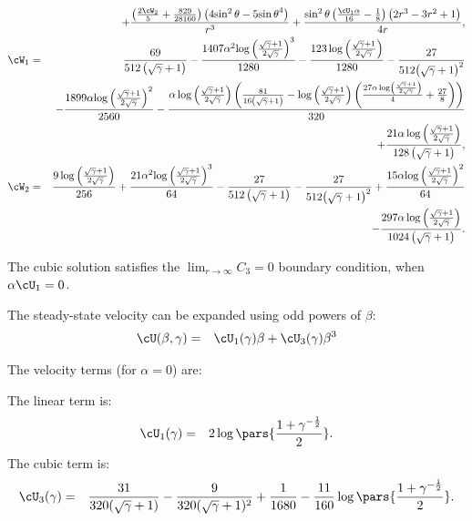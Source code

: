\begin{eqnarray*}
\\ && + \frac{\left(\frac{2 {\cW_2}}{5} + \frac{829}{28160}\right) \left(4 {\sin^2\theta} - 5 {\sin\theta}^4\right)}{r^3} + \frac{{\sin^2\theta} \left(\frac{{\cU_1}\alpha}{16} - \frac{1}{8}\right) \left(2 r^3 - 3 r^2 + 1\right)}{4 r},
\\
\cW_1 &=& \frac{69}{512 \left(\sqrt{\gamma} + 1\right)} - \frac{1407\alpha^2 {\log\left(\frac{\sqrt{\gamma} + 1}{2 \sqrt{\gamma}}\right)}^3}{1280} - \frac{123 \log\left(\frac{\sqrt{\gamma} + 1}{2 \sqrt{\gamma}}\right)}{1280} - \frac{27}{512 {\left(\sqrt{\gamma} + 1\right)}^2} \\ && -
\frac{1899\alpha {\log\left(\frac{\sqrt{\gamma} + 1}{2 \sqrt{\gamma}}\right)}^2}{2560} - \frac{\alpha \log\left(\frac{\sqrt{\gamma} + 1}{2 \sqrt{\gamma}}\right) \left(\frac{81}{16 \left(\sqrt{\gamma} + 1\right)} - \log\left(\frac{\sqrt{\gamma} + 1}{2 \sqrt{\gamma}}\right) \left(\frac{27\alpha \log\left(\frac{\sqrt{\gamma} + 1}{2 \sqrt{\gamma}}\right)}{4} + \frac{27}{8}\right)\right)}{320} \\ && + 
\frac{21\alpha \log\left(\frac{\sqrt{\gamma} + 1}{2 \sqrt{\gamma}}\right)}{128 \left(\sqrt{\gamma} + 1\right)},
\\
\cW_2 &=& \frac{9 \log\left(\frac{\sqrt{\gamma} + 1}{2 \sqrt{\gamma}}\right)}{256} + \frac{21\alpha^2 {\log\left(\frac{\sqrt{\gamma} + 1}{2 \sqrt{\gamma}}\right)}^3}{64} - \frac{27}{512 \left(\sqrt{\gamma} + 1\right)} - \frac{27}{512 {\left(\sqrt{\gamma} + 1\right)}^2}
 + \frac{15\alpha {\log\left(\frac{\sqrt{\gamma} + 1}{2 \sqrt{\gamma}}\right)}^2}{64} 
\\ && 
- \frac{297\alpha \log\left(\frac{\sqrt{\gamma} + 1}{2 \sqrt{\gamma}}\right)}{1024 \left(\sqrt{\gamma} + 1\right)}.
\end{eqnarray*}

The cubic solution satisfies the $\lim_{r\rightarrow\infty}C_3 = 0$ boundary condition, 
when $\alpha\cU_1 = 0$.

The steady-state velocity can be expanded using odd powers of $\beta$:
\begin{eqnarray*}
\cU(\beta, \gamma) &=& \cU_1(\gamma) \beta + \cU_3(\gamma) \beta^3
\end{eqnarray*}

The velocity terms (for $\alpha = 0$) are:

The linear term is:
\begin{eqnarray*}
\cU_1(\gamma) &=& 2 \log \pars{\frac{1 + \gamma^{-\frac{1}{2}}}{2}}. \\
\end{eqnarray*}
The cubic term is:
\begin{eqnarray*}
\cU_3(\gamma) &=& \frac{31}{320(\sqrt\gamma + 1)} - \frac{9}{320(\sqrt\gamma + 1)^2} + \frac{1}{1680} - \frac{11}{160} \log \pars{\frac{1 + \gamma^{-\frac{1}{2}}}{2}}.
\end{eqnarray*}

